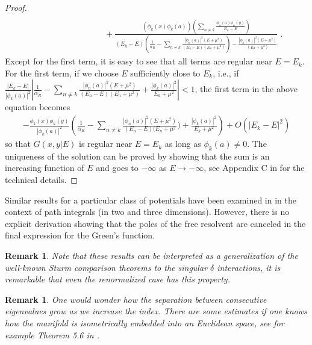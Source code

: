 \documentclass[amsmath,amssymb,14pt]{article}
\numberwithin{equation}{section}
\newtheorem{myremark}[mytheo]{Remark}
\begin{document}
\begin{proof}
\begin{eqnarray}
    \nonumber \\ & & \hspace{3cm} + \frac{ \left(\phi_k(x) \overline{\phi_k(a)} \right) \left( \sum_{n \neq k} \frac{\phi_n(a) \overline{\phi_n(y)}}{E_n-E}\right)}{(E_k-E) \left(\frac{1}{\alpha_R}-\sum_{n \neq k} \frac{|\phi_n(a)|^2(E+\mu^2)}{(E_n-E)(E_n+\mu^2)}\right) - \frac{|\phi_k(a)|^2(E+\mu^2)}{(E_k+\mu^2)}} \;.
\end{eqnarray}
%
Except for the first term, it is easy to see that all terms are regular near $E=E_k$. For the first term, if we choose $E$ sufficiently close to $E_k$, i.e., if $\frac{|E_k-E|}{|\phi_k(a)|^2} \left|\frac{1}{\alpha_R}-\sum_{n \neq k} \frac{|\phi_n(a)|^2 (E+\mu^2)}{(E_n-E)(E_n +\mu^2)}  + \frac{|\phi_{k}(a)|^2}{E_k + \mu^2} \right|<1$, the first term in the above equation becomes
%
\begin{eqnarray}
- \frac{\phi_k(x) \overline{\phi_k(y)}}{|\phi_k(a)|^2}  \left(\frac{1}{\alpha_R}-\sum_{n \neq k} \frac{|\phi_n(a)|^2 (E+\mu^2)}{(E_n-E)(E_n +\mu^2}) + \frac{|\phi_{k}(a)|^2}{E_k + \mu^2} 
\right) + O(|E_k-E|^2)
\end{eqnarray}
%
so that $G(x,y|E)$ is regular near $E=E_k$ as long as $\phi_k(a)\neq 0$. The uniqueness of the solution can be proved by showing that the sum is an increasing function of $E$ and goes to $-\infty$ as $E \to -\infty$, see Appendix C in \cite{Annals23} for the technical details.
\end{proof}


Similar results for a particular class of potentials have been examined in \cite{Grosche2} in the context of path integrals (in two and three dimensions). However, there is no explicit derivation  showing that the poles of the free resolvent are canceled in the final expression for the Green's function.


 

\begin{myremark}
Note that these results can be interpreted as a generalization of the well-known Sturm comparison theorems to the singular $\delta$ interactions, it is remarkable that even the renormalized case has this property. 
\end{myremark}



\begin{myremark} One would wonder how the separation between consecutive eigenvalues grow as we increase the index. There are some estimates if one knows how the manifold is isometrically embedded into an Euclidean space, see for example Theorem 5.6 in \cite{Urakawa-thebook}.
\end{myremark}
\end{document}
